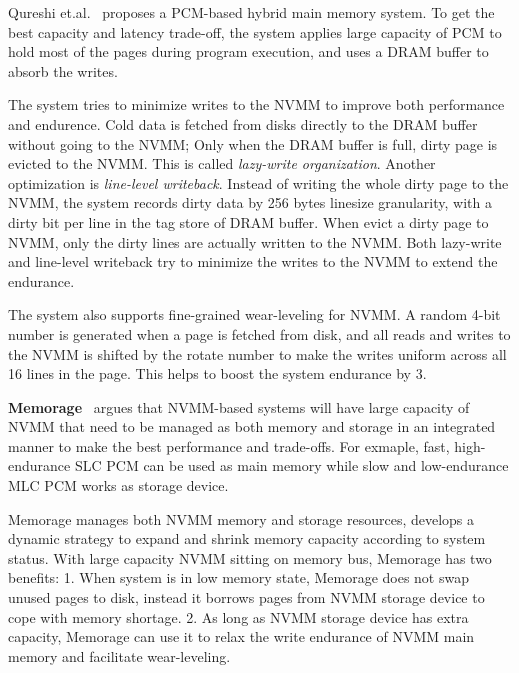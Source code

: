 
Qureshi et.al.~\cite{PCMHierarchy} proposes a PCM-based hybrid main memory
system. To get the best capacity and latency trade-off, the system applies
large capacity of PCM to hold most of the pages during program execution,
and uses a DRAM buffer to absorb the writes. 

The system tries to minimize writes to the NVMM to improve both performance
and endurence. Cold data is fetched from disks directly to the DRAM buffer
without going to the NVMM; Only when the DRAM buffer is full, dirty page is 
evicted to the NVMM. This is called \emph{lazy-write organization}. Another
optimization is \emph{line-level writeback}. Instead of writing the whole dirty
page to the NVMM, the system records dirty data by 256 bytes linesize
granularity, with a dirty bit per line in the tag store of DRAM buffer.
When evict a dirty page to NVMM, only the dirty lines are actually written to
the NVMM. Both lazy-write and line-level writeback try to minimize the writes
to the NVMM to extend the endurance.

The system also supports fine-grained wear-leveling for NVMM. A random 4-bit 
number is generated when a page is fetched from disk, and all reads and writes
to the NVMM is shifted by the rotate number to make
the writes uniform across all 16 lines in the page.
This helps to boost the system endurance by 3\x{}.

\textbf{Memorage}~\cite{memorage} argues that NVMM-based systems will have large
capacity of NVMM that need to be managed as both memory and storage in
an integrated manner to make the best performance and trade-offs. For exmaple,
fast, high-endurance SLC PCM can be used as main memory
while slow and low-endurance MLC PCM works as storage device.

Memorage manages both NVMM memory and storage resources, develops a dynamic
strategy to expand and shrink memory capacity according to system status. 
With large capacity NVMM sitting on memory bus, Memorage has two benefits:
1. When system is in low memory state, Memorage does not swap unused pages
to disk, instead it borrows pages from NVMM storage device to cope with
memory shortage.
2. As long as NVMM storage device has extra capacity, Memorage can use it
to relax the write endurance of NVMM main memory and facilitate wear-leveling.

